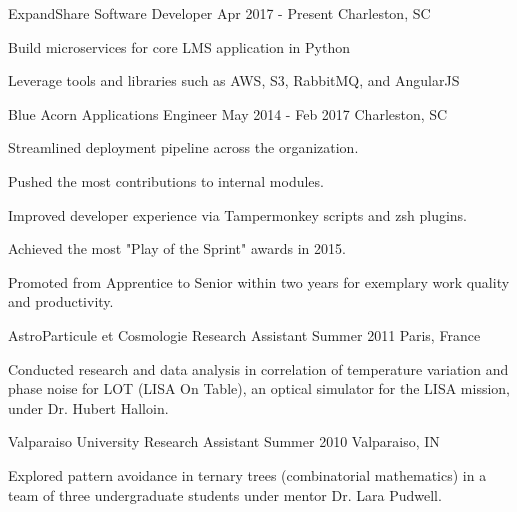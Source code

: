 

\begin{cventries}

  \cventry
    {ExpandShare}
    {Software Developer}
    {Apr 2017 - Present}
    {Charleston, SC}
    {
      \begin{cvitems}
        \item {Build microservices for core LMS application in Python}
        \item {Leverage tools and libraries such as AWS, S3, RabbitMQ, and AngularJS}
      \end{cvitems}
    }

  \cventry
    {Blue Acorn} %
    {Applications Engineer} %
    {May 2014 - Feb 2017} %
    {Charleston, SC} %
    {
      \begin{cvitems} %
        \item {Streamlined deployment pipeline across the organization.}
        \item {Pushed the most contributions to internal modules.}
        \item {Improved developer experience via Tampermonkey scripts and zsh plugins.}
        \item {Achieved the most "Play of the Sprint" awards in 2015.}
        \item {Promoted from Apprentice to Senior within two years for exemplary work quality and productivity.}
      \end{cvitems}
    }

  \cventry
    {AstroParticule et Cosmologie}
    {Research Assistant}
    {Summer 2011}
    {Paris, France}
    {
      \begin{cvitems}
        \item {Conducted research and data analysis in correlation of temperature variation and phase noise for LOT (LISA On Table), an optical simulator for the LISA mission, under Dr. Hubert Halloin.}
      \end{cvitems}
    }

  \cventry
    {Valparaiso University}
    {Research Assistant}
    {Summer 2010}
    {Valparaiso, IN}
    {
      \begin{cvitems}
        \item {Explored pattern avoidance in ternary trees (combinatorial mathematics) in a team of three undergraduate students under mentor Dr. Lara Pudwell.}
      \end{cvitems}
    }

\end{cventries}
